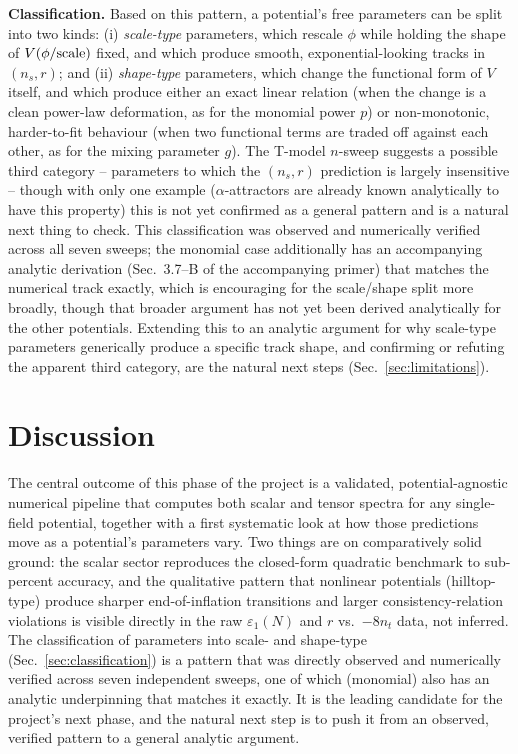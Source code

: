 \documentclass[11pt]{article}
\begin{document}
\textbf{Classification.} Based on this pattern, a potential's free parameters can be split
into two kinds: (i) \emph{scale-type} parameters, which rescale $\phi$ while holding the
shape of $V(\phi/{\rm scale})$ fixed, and which produce smooth, exponential-looking tracks
in $(n_s,r)$; and (ii) \emph{shape-type} parameters, which change the functional form of
$V$ itself, and which produce either an exact linear relation (when the change is a clean
power-law deformation, as for the monomial power $p$) or non-monotonic, harder-to-fit
behaviour (when two functional terms are traded off against each other, as for the
mixing parameter $g$). The T-model $n$-sweep suggests a possible third category --
parameters to which the $(n_s,r)$ prediction is largely insensitive -- though with only
one example ($\alpha$-attractors are already known analytically to have this property)
this is not yet confirmed as a general pattern and is a natural next thing to check.
This classification was observed and numerically verified across all seven sweeps; the
monomial case additionally has an accompanying analytic derivation (Sec.~3.7--B of the
accompanying primer) that matches the numerical track exactly, which is encouraging for
the scale/shape split more broadly, though that broader argument has not yet been derived
analytically for the other potentials. Extending this to an analytic argument for why scale-type
parameters generically produce a specific track shape, and confirming or refuting the
apparent third category, are the natural next steps (Sec.~\ref{sec:limitations}).

\section{Discussion}
The central outcome of this phase of the project is a validated, potential-agnostic
numerical pipeline that computes both scalar and tensor spectra for any single-field
potential, together with a first systematic look at how those predictions move as a
potential's parameters vary. Two things are on comparatively solid ground: the scalar
sector reproduces the closed-form quadratic benchmark to sub-percent accuracy, and the
qualitative pattern that nonlinear potentials (hilltop-type) produce sharper end-of-inflation
transitions and larger consistency-relation violations is visible directly in the raw
$\varepsilon_1(N)$ and $r$ vs.\ $-8n_t$ data, not inferred. The classification of
parameters into scale- and shape-type (Sec.~\ref{sec:classification}) is a pattern that
was directly observed and numerically verified across seven independent sweeps, one of
which (monomial) also has an analytic underpinning that matches it exactly. It is the
leading candidate for the project's next phase, and the natural next step is to push it
from an observed, verified pattern to a general analytic argument.
\end{document}
